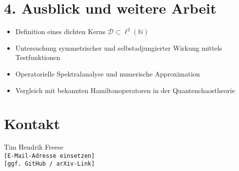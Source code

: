 \documentclass[12pt]{article}
\begin{document}
\bigskip

\section*{4. Ausblick und weitere Arbeit}

\begin{itemize}
  \item Definition eines dichten Kerns \( \mathcal{D} \subset \ell^2(\mathbb{N}) \)
  \item Untersuchung symmetrischer und selbstadjungierter Wirkung mittels Testfunktionen
  \item Operatorielle Spektralanalyse und numerische Approximation
  \item Vergleich mit bekannten Hamiltonoperatoren in der Quantenchaostheorie
\end{itemize}


\section*{Kontakt}
Tim Hendrik Freese\\
\texttt{[E-Mail-Adresse einsetzen]}\\
\texttt{[ggf. GitHub / arXiv-Link]}
\bigskip
\end{document}
